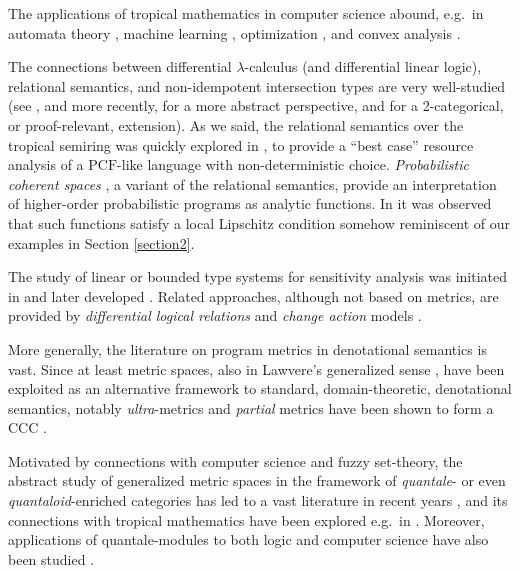 

The applications of tropical mathematics in computer science abound, e.g.~in automata theory \cite{Chua1992, Simon}, machine learning \cite{Maragos2021, Pachter2004, Zhang2018}, optimization \cite{Akian2011, Akian2012}, and convex analysis \cite{Lucet2009}. 

The connections between differential $\lambda$-calculus (and differential linear logic), relational semantics, and non-idempotent intersection types are very well-studied (see \cite{decarvalho2018}, and more recently, \cite{Mazza2016} for a more abstract perspective, and \cite{Olimpieri2021, Galal2021} for a 2-categorical, or proof-relevant, extension).
As we said, the relational semantics over the tropical semiring was quickly explored in \cite{Manzo2013}, to provide a ``best case'' resource analysis of a $\mathrm{PCF}$-like language with non-deterministic choice. 
\emph{Probabilistic coherent spaces} \cite{Ehrhard2011}, a variant of  the relational semantics, provide an interpretation of higher-order probabilistic programs
as analytic functions. In \cite{Ehrhard2022} it was observed that such functions satisfy a local Lipschitz condition somehow reminiscent of our examples in Section \ref{section2}.


The study of linear or bounded type systems for sensitivity analysis was initiated in \cite{Girard92tcs} and later developed \cite{Schopp, SchoppDalLago, Reed2010}.
Related approaches, although not based on metrics, are provided by \emph{differential logical relations} \cite{dallago} and \emph{change action} models \cite{Picallo2019}.


More generally, the literature on program metrics in denotational semantics is vast. Since at least \cite{VANBREUGEL20011} metric spaces, also in Lawvere's generalized sense \cite{Lawvere1973}, have been exploited as an alternative framework to standard, domain-theoretic, denotational semantics, notably
\emph{ultra}-metrics and \emph{partial} metrics have been shown to form a CCC \cite{Escardo1999,PistoneLICS, PistoneFSCD2022}.

Motivated by connections with computer science and fuzzy set-theory, 
the abstract study of generalized metric spaces in the framework of \emph{quantale}- or even \emph{quantaloid}-enriched categories has led to a vast literature in recent years \cite{Hofmann2014, Stubbe2014}, 
and its connections with tropical mathematics have been explored e.g.~in \cite{Fuji, Willerton2013}. Moreover, applications of quantale-modules to both logic and computer science have also been studied \cite{Abramsky1993b, Russo2007}.


